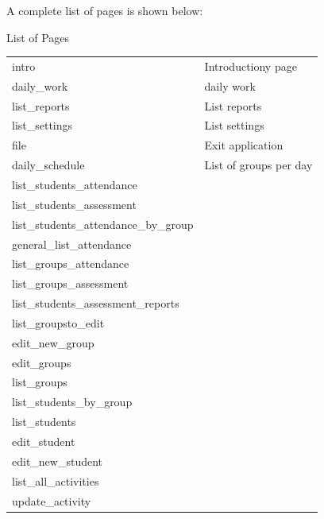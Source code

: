 A complete list of pages is shown below:

\begin{bclogo}[couleur=orange!30,logo=\bcbook,arrondi=0.1,ombre=true ] 
{List of Pages}
\begin{tabular}{l|l}
intro & Introductiony page              \\
daily\_work & daily work \\
list\_reports & List reports             \\
list\_settings  & List settings\\
file & Exit application                  \\
daily\_schedule & List of groups per day\\
list\_students\_attendance &             \\
list\_students\_assessment &  \\
list\_students\_attendance\_by\_group &  \\
general\_list\_attendance &  \\
list\_groups\_attendance  &              \\
list\_groups\_assessment &  \\
list\_students\_assessment\_reports &    \\
list\_groupsto\_edit &  \\
edit\_new\_group &                      \\
 edit\_groups  & \\
list\_groups &                          \\
  list\_students\_by\_group & \\
list\_students &                        \\
  edit\_student   &   \\
edit\_new\_student &                    \\
  list\_all\_activities & \\
update\_activity  &                     
\end{tabular}

\end{bclogo}	

	
